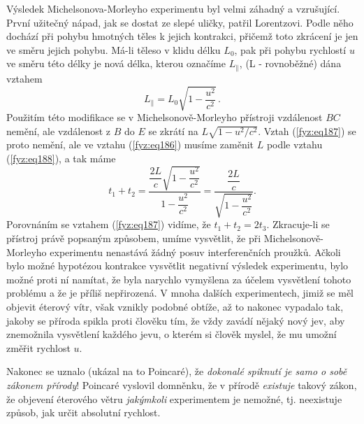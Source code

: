     Výsledek Michelsonova-Morleyho experimentu byl velmi záhadný a vzrušující. První užitečný 
    nápad, jak se dostat ze slepé uličky, patřil Lorentzovi. Podle něho dochází při pohybu hmotných 
    těles k jejich kontrakci, přičemž toto zkrácení je jen ve směru jejich pohybu. Má-li těleso v 
    klidu délku \(L_0\), pak při pohybu rychlostí \(u\) ve směru této délky je nová délka, kterou 
    označíme \(L_\parallel\), (L - rovnoběžné) dána vztahem
    \begin{equation}\label{fyz:eq188}
      \boxed{L_\parallel = L_0\sqrt{1 - \frac{u^2}{c^2}}}\,.
    \end{equation}
    Použitím této modifikace se v Michelsonově-Morleyho přístroji vzdálenost \(BC\) nemění, ale 
    vzdálenost z \(B\) do \(E\) se zkrátí na \(L\sqrt{1 - u^2/c^2}\). Vztah (\ref{fyz:eq187}) se 
    proto nemění, ale ve vztahu (\ref{fyz:eq186}) musíme zaměnit \(L\) podle vztahu 
    (\ref{fyz:eq188}), a tak máme 
    \begin{equation}\label{fyz:eq189}
      t_1 + t_2 = \frac{\dfrac{2L}{c}\sqrt{1- \dfrac{u^2}{c^2}}}{1- \dfrac{u^2}{c^2}}
                = \frac{\dfrac{2L}{c}}{\sqrt{1- \dfrac{u^2}{c^2}}}.
    \end{equation}
    Porovnáním se vztahem (\ref{fyz:eq187}) vidíme, že \(t_1 + t_2 = 2t_3\). Zkracuje-li se 
    přístroj právě popsaným způsobem, umíme vysvětlit, že při Michelsonově-Morleyho experimentu 
    nenastává žádný posuv interferenčních proužků. Ačkoli bylo možné hypotézou kontrakce vysvětlit 
    negativní výsledek experimentu, bylo možné proti ní namítat, že byla narychlo vymyšlena za 
    účelem vysvětlení tohoto problému a že je příliš nepřirozená. V mnoha dalších experimentech, 
    jimiž se měl objevit éterový vítr, však vznikly podobné obtíže, až to nakonec vypadalo tak, 
    jakoby se příroda spikla proti člověku tím, že vždy zavádí nějaký nový jev, aby znemožnila 
    vysvětlení každého jevu, o kterém si člověk myslel, že mu umožní změřit rychlost \(u\).
    
    Nakonec se uznalo (ukázal na to Poincaré), že \emph{dokonalé spiknutí je samo o sobě zákonem 
    přírody}! Poincaré vyslovil domněnku, že v přírodě \emph{existuje} takový zákon, že objevení 
    éterového větru \emph{jakýmkoli} experimentem je nemožné, tj. neexistuje způsob, jak určit 
    absolutní rychlost.
    
    
